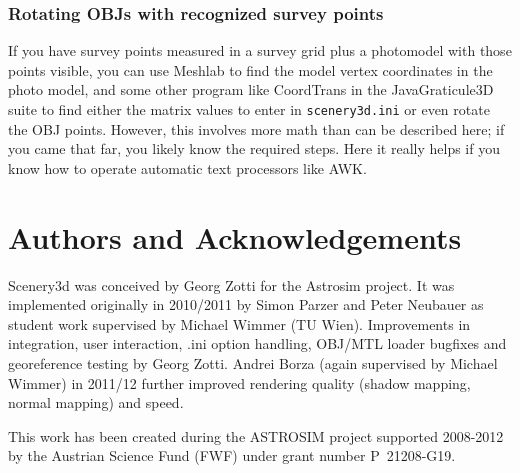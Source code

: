 \documentclass[a4paper]{article}
\newcommand{\filename}[1]{\texttt{#1}}
\begin{document}
\subsubsection{Rotating OBJs with recognized survey points}
\label{sec:RotatingOBJ}


If you have survey points measured in a survey grid plus a photomodel
with those points visible, you can use Meshlab to find the model
vertex coordinates in the photo model, and some other program like
CoordTrans in the JavaGraticule3D suite to find either the matrix
values to enter in \filename{scenery3d.ini} or even rotate the OBJ
points. However, this involves more math than can be described here;
if you came that far, you likely know the required steps.  Here it
really helps if you know how to operate automatic text processors like
AWK.

\section*{Authors and Acknowledgements}
\label{Acknowledgments}


Scenery3d was conceived by Georg Zotti for the Astrosim project. It
was implemented originally in 2010/2011 by Simon Parzer and Peter
Neubauer as student work supervised by Michael Wimmer (TU
Wien). Improvements in integration, user interaction, .ini option
handling, OBJ/MTL loader bugfixes and georeference testing by Georg
Zotti. Andrei Borza (again supervised by Michael Wimmer) in 2011/12
further improved rendering quality (shadow mapping, normal mapping) and speed.

This work has been created during the ASTROSIM project supported
2008-2012 by the Austrian Science Fund (FWF) under grant number
P~21208-G19. 
\end{document}
